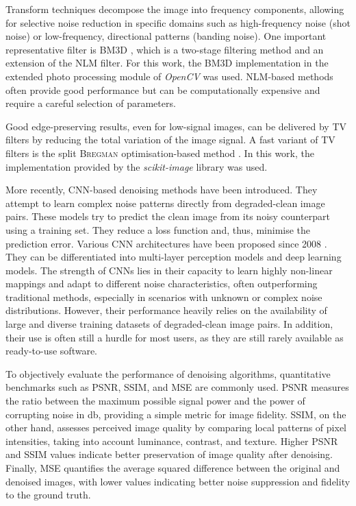 Transform techniques decompose the image into frequency components, allowing for selective noise reduction in specific domains such as high-frequency noise (shot noise) or low-frequency, directional patterns (banding noise).
One important representative filter is \ac{BM3D} \cite{dabov.2007}, which is a two-stage filtering method and an extension of the \ac{NLM} filter.
For this work, the \ac{BM3D} implementation in the extended photo processing module of \textit{OpenCV} \cite{bradski.2000} was used.
\ac{NLM}-based methods often provide good performance but can be computationally expensive and require a careful selection of parameters.

Good edge-preserving results, even for low-signal images, can be delivered by \ac{TV} \cite{rudin.1992} filters by reducing the total variation of the image signal.
A fast variant of \ac{TV} filters is the split \textsc{Bregman} optimisation-based method \cite{goldstein.2009, getreuer.2012}.
In this work, the implementation provided by the \textit{scikit-image} \cite{vanderwalt.2014} library was used.

More recently, \ac{CNN}-based denoising methods have been introduced.
They attempt to learn complex noise patterns directly from degraded-clean image pairs.
These models try to predict the clean image from its noisy counterpart using a training set.
They reduce a loss function and, thus, minimise the prediction error.
Various \ac{CNN} architectures have been proposed since 2008 \cite{jain.2008}.
They can be differentiated into multi-layer perception models and deep learning models.
The strength of \ac{CNN}s lies in their capacity to learn highly non-linear mappings and adapt to different noise characteristics, often outperforming traditional methods, especially in scenarios with unknown or complex noise distributions.
However, their performance heavily relies on the availability of large and diverse training datasets of degraded-clean image pairs.
In addition, their use is often still a hurdle for most users, as they are still rarely available as ready-to-use software.

To objectively evaluate the performance of denoising algorithms, quantitative benchmarks such as \ac{PSNR}, \ac{SSIM}, and \ac{MSE} are commonly used.
\ac{PSNR} measures the ratio between the maximum possible signal power and the power of corrupting noise in \unit{\decibel}, providing a simple metric for image fidelity.
\ac{SSIM}, on the other hand, assesses perceived image quality by comparing local patterns of pixel intensities, taking into account luminance, contrast, and texture.
Higher \ac{PSNR} and \ac{SSIM} values indicate better preservation of image quality after denoising.
Finally, \ac{MSE} quantifies the average squared difference between the original and denoised images, with lower values indicating better noise suppression and fidelity to the ground truth.

